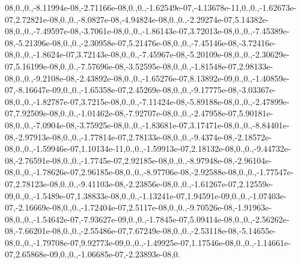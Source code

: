 \begin{DoxyCompactItemize}
08,0.,0.,-\/8.\-11994e-\/08,-\/2.\-71166e-\/08,0.,0.,-\/1.\-62549e-\/07,-\/4.\-13678e-\/11,0.,0.,-\/1.\-62673e-\/07,2.\-72821e-\/08,0.,0.,-\/8.\-0827e-\/08,-\/4.\-94824e-\/08,0.,0.,-\/2.\-29274e-\/07,5.\-14382e-\/08,0.,0.,-\/7.\-49597e-\/08,-\/3.\-7061e-\/08,0.,0.,-\/1.\-86143e-\/07,3.\-72013e-\/08,0.,0.,-\/7.\-45389e-\/08,-\/5.\-21396e-\/08,0.,0.,-\/2.\-30958e-\/07,5.\-21476e-\/08,0.,0.,-\/7.\-45146e-\/08,-\/3.\-72416e-\/08,0.,0.,-\/1.\-8624e-\/07,3.\-72143e-\/08,0.,0.,-\/7.\-45967e-\/08,-\/5.\-20109e-\/08,0.,0.,-\/2.\-30629e-\/07,5.\-16199e-\/08,0.,0.,-\/7.\-57696e-\/08,-\/3.\-52595e-\/08,0.,0.,-\/1.\-81548e-\/07,2.\-98133e-\/08,0.,0.,-\/9.\-2108e-\/08,-\/2.\-43892e-\/08,0.,0.,-\/1.\-65276e-\/07,8.\-13892e-\/09,0.,0.,-\/1.\-40859e-\/07,-\/8.\-16647e-\/09,0.,0.,-\/1.\-65358e-\/07,2.\-45269e-\/08,0.,0.,-\/9.\-17775e-\/08,-\/3.\-03367e-\/08,0.,0.,-\/1.\-82787e-\/07,3.\-7215e-\/08,0.,0.,-\/7.\-11424e-\/08,-\/5.\-89188e-\/08,0.,0.,-\/2.\-47899e-\/07,7.\-92509e-\/08,0.,0.,-\/1.\-01462e-\/08,-\/7.\-92707e-\/08,0.,0.,-\/2.\-47958e-\/07,5.\-90181e-\/08,0.,0.,-\/7.\-0904e-\/08,-\/3.\-75925e-\/08,0.,0.,-\/1.\-83681e-\/07,3.\-17471e-\/08,0.,0.,-\/8.\-84401e-\/08,-\/2.\-97913e-\/08,0.,0.,-\/1.\-77814e-\/07,2.\-78133e-\/08,0.,0.,-\/9.\-4374e-\/08,-\/2.\-18572e-\/08,0.,0.,-\/1.\-59946e-\/07,1.\-10134e-\/11,0.,0.,-\/1.\-59913e-\/07,2.\-18132e-\/08,0.,0.,-\/9.\-44732e-\/08,-\/2.\-76591e-\/08,0.,0.,-\/1.\-7745e-\/07,2.\-92185e-\/08,0.,0.,-\/8.\-97948e-\/08,-\/2.\-96104e-\/08,0.,0.,-\/1.\-78626e-\/07,2.\-96185e-\/08,0.,0.,-\/8.\-97706e-\/08,-\/2.\-92588e-\/08,0.,0.,-\/1.\-77547e-\/07,2.\-78123e-\/08,0.,0.,-\/9.\-41103e-\/08,-\/2.\-23856e-\/08,0.,0.,-\/1.\-61267e-\/07,2.\-12559e-\/09,0.,0.,-\/1.\-5489e-\/07,1.\-38833e-\/08,0.,0.,-\/1.\-13241e-\/07,1.\-94591e-\/09,0.,0.,-\/1.\-07403e-\/07,-\/2.\-16669e-\/08,0.,0.,-\/1.\-72404e-\/07,2.\-5117e-\/08,0.,0.,-\/9.\-70526e-\/08,-\/1.\-91963e-\/08,0.,0.,-\/1.\-54642e-\/07,-\/7.\-93627e-\/09,0.,0.,-\/1.\-7845e-\/07,5.\-09414e-\/08,0.,0.,-\/2.\-56262e-\/08,-\/7.\-66201e-\/08,0.,0.,-\/2.\-55486e-\/07,7.\-67249e-\/08,0.,0.,-\/2.\-53118e-\/08,-\/5.\-14655e-\/08,0.,0.,-\/1.\-79708e-\/07,9.\-92773e-\/09,0.,0.,-\/1.\-49925e-\/07,1.\-17546e-\/08,0.,0.,-\/1.\-14661e-\/07,2.\-65868e-\/09,0.,0.,-\/1.\-06685e-\/07,-\/2.\-23893e-\/08,0.
\end{DoxyCompactItemize}
